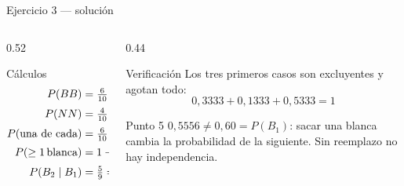 \documentclass[aspectratio=169,10pt]{beamer}
\begin{document}
\begin{frame}{Ejercicio 3 — solución}
  \begin{columns}[T,onlytextwidth]
    \begin{column}{0.52\textwidth}
      \begin{block}{Cálculos}
        \footnotesize
        \begin{align*}
          P(BB) &= \tfrac{6}{10}\cdot\tfrac{5}{9}=\azul{0{,}3333}\\[0.2em]
          P(NN) &= \tfrac{4}{10}\cdot\tfrac{3}{9}=\azul{0{,}1333}\\[0.2em]
          P(\text{una de cada}) &= \tfrac{6}{10}\tfrac{4}{9}+\tfrac{4}{10}\tfrac{6}{9}
             =\azul{0{,}5333}\\[0.2em]
          P(\ge 1\,\text{blanca}) &= 1-P(NN)=\azul{0{,}8667}\\[0.2em]
          P(B_2\mid B_1) &= \tfrac{5}{9}=\azul{0{,}5556}
        \end{align*}
      \end{block}
    \end{column}
    \begin{column}{0.44\textwidth}
      \begin{exampleblock}{Verificación}
        \footnotesize
        Los tres primeros casos son excluyentes y agotan todo:
        \[ 0{,}3333+0{,}1333+0{,}5333=1 \]
      \end{exampleblock}
      \begin{alertblock}{Punto 5}
        \footnotesize
        $0{,}5556 \neq 0{,}60=P(B_1)$: sacar una blanca  cambia la
        probabilidad de la siguiente. Sin reemplazo no hay independencia.
      \end{alertblock}
    \end{column}
  \end{columns}
\end{frame}
\end{document}
